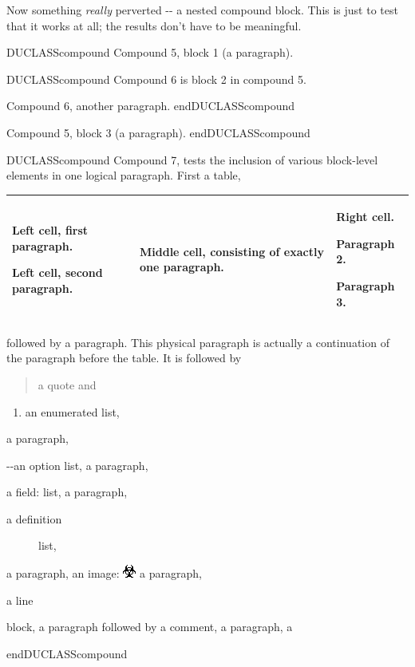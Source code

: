 \documentclass[a4paper]{memoir}
\newlength{\DUtablewidth} %
\newenvironment{DUclass}[1]%
  {%
   \def\DocutilsClassFunctionName{DUCLASS#1}
     \csname \DocutilsClassFunctionName \endcsname}%
  {\csname end\DocutilsClassFunctionName \endcsname}%
\newenvironment{DUfieldlist}%
    {\quote\description}
    {\enddescription\endquote}
\newenvironment{DUlineblock}[1]{%
    \list{}{\setlength{\partopsep}{\parskip}
            \addtolength{\partopsep}{\baselineskip}
            \setlength{\topsep}{0pt}
            \setlength{\itemsep}{0.15\baselineskip}
            \setlength{\parsep}{0pt}
            \setlength{\leftmargin}{#1}}
    \raggedright
  }
  {\endlist}
\providecommand*{\DUoptionlistlabel}[1]{\bfseries #1 \hfill}
\newenvironment{DUoptionlist}{%
    \list{}{\setlength{\labelwidth}{\DUoptionlistindent}
            \setlength{\rightmargin}{1cm}
            \setlength{\leftmargin}{\rightmargin}
            \addtolength{\leftmargin}{\labelwidth}
            \addtolength{\leftmargin}{\labelsep}
            \renewcommand{\makelabel}{\DUoptionlistlabel}}
  }
  {\endlist}
\begin{document}
Now something \emph{really} perverted -{}- a nested compound block.  This is
just to test that it works at all; the results don't have to be
meaningful.

\begin{DUclass}{compound}
Compound 5, block 1 (a paragraph).

\begin{DUclass}{compound}
Compound 6 is block 2 in compound 5.

Compound 6, another paragraph.
\end{DUclass}

Compound 5, block 3 (a paragraph).
\end{DUclass}

\begin{DUclass}{compound}
Compound 7, tests the inclusion of various block-level
elements in one logical paragraph. First a table,

\setlength{\DUtablewidth}{\linewidth}%
\begin{longtable*}{|p{0.249\DUtablewidth}|p{0.249\DUtablewidth}|p{0.249\DUtablewidth}|}
\hline

Left cell, first
paragraph.

Left cell, second
paragraph.
 & 
Middle cell,
consisting of
exactly one
paragraph.
 & 
Right cell.

Paragraph 2.

Paragraph 3.
 \\
\hline
\end{longtable*}
followed by a paragraph. This physical paragraph is
actually a continuation of the paragraph before the table. It is followed
by
\begin{quote}
a quote and
\end{quote}
\begin{enumerate}
\item an enumerated list,
\end{enumerate}
a paragraph,
\begin{DUoptionlist}
\item[-{}-an]  option list,
\end{DUoptionlist}
a paragraph,
\begin{DUfieldlist}
\item[{a field:}]
list,
\end{DUfieldlist}
a paragraph,
\begin{description}
\item[{a definition}] 
list,

\end{description}
a paragraph, an image:
\includegraphics{../../../docs/user/rst/images/biohazard.png}
a paragraph,
\begin{DUlineblock}{0em}
\item[] a line
\item[] block,
\end{DUlineblock}
a paragraph followed by a comment,
a paragraph, a


\end{DUclass}
\end{document}
